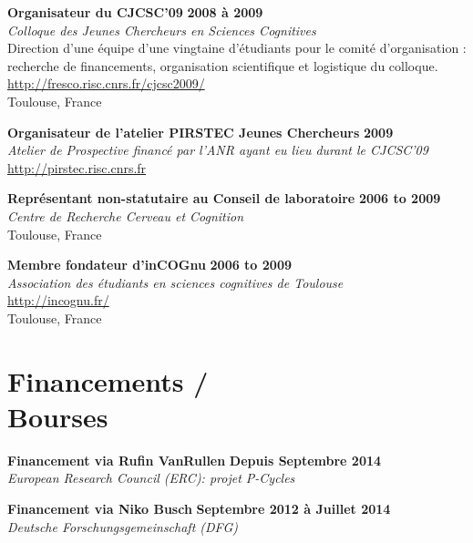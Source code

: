 \documentclass[margin,line]{resume}
\begin{document}
\begin{resume}
	\vspace{-2mm} 
	\textbf{Organisateur du CJCSC'09} \hfill \textbf{2008 à 2009}\\
	\textsl{Colloque des Jeunes Chercheurs en Sciences Cognitives}\\
	Direction d'une équipe d'une vingtaine d'étudiants pour le comité d'organisation : recherche de financements, organisation scientifique et logistique du colloque.\\
	 \url{http://fresco.risc.cnrs.fr/cjcsc2009/}\\
	Toulouse, France	

	\vspace{-2mm} 
	\textbf{Organisateur de l'atelier PIRSTEC Jeunes Chercheurs} \hfill \textbf{2009}\\
	\textsl{Atelier de Prospective financé par l'ANR ayant eu lieu durant le CJCSC'09}\\
	\url{http://pirstec.risc.cnrs.fr}

\newpage

	\vspace{-2mm} 
	\textbf{Représentant non-statutaire au Conseil de laboratoire} \hfill \textbf{2006 to 2009}\\
	\textsl{Centre de Recherche Cerveau et Cognition}\\
	Toulouse, France	

	\vspace{-2mm} 
	\textbf{Membre fondateur d'inCOGnu} \hfill \textbf{2006 to 2009}\\
	\textsl{Association des étudiants en sciences cognitives de Toulouse}\\
	 \url{http://incognu.fr/}\\
	Toulouse, France	


\vspace{3mm}
    \section{\mysidestyle Financements /\\Bourses}

 	\textbf{Financement via Rufin VanRullen} \hfill \textbf{Depuis Septembre 2014}\\
 	\textsl{European Research Council (ERC): projet P-Cycles}
 
	\vspace{-2mm} 
	\textbf{Financement via Niko Busch} \hfill \textbf{Septembre 2012 à Juillet 2014}\\
	\textsl{Deutsche Forschungsgemeinschaft (DFG)}


\end{resume}
\end{document}
